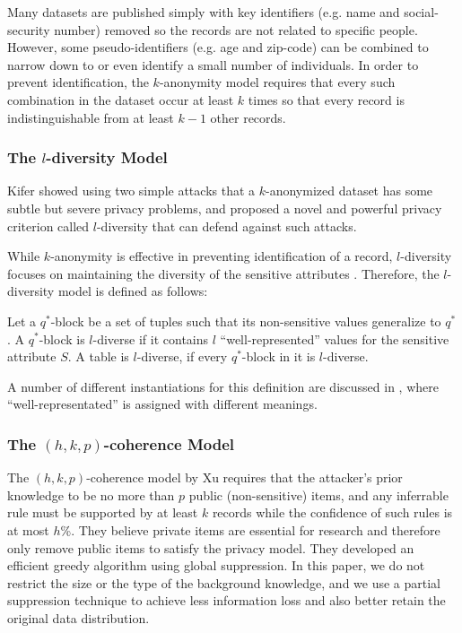 Many datasets are published simply with key identifiers (e.g. name and
social-security number) removed so the records are not related to specific
people.  However, some pseudo-identifiers (e.g. age and zip-code) can be
combined to narrow down to or even identify a small number of individuals.
In order to prevent identification, the $k$-anonymity model requires that
every such combination in the dataset occur at least $k$ times so that
every record is indistinguishable from at least $k-1$ other records.

\subsubsection{The $l$-diversity Model}

Kifer \etal \cite{Kifer:l-diversity} showed using two simple attacks that a
$k$-anonymized dataset has some subtle but severe privacy problems, and
proposed a novel and powerful privacy criterion called $l$-diversity that
can defend against such attacks.

While $k$-anonymity is effective in preventing identification of a record,
$l$-diversity focuses on maintaining the diversity of the sensitive attributes \cite{aggarwal2008general}.
Therefore, the $l$-diversity model is defined as follows:

\begin{definition}
  Let a $q^*$-block be a set of tuples such that its non-sensitive values
  generalize to $q^*$.  A $q^*$-block is $l$-diverse if it contains $l$
  ``well-represented'' values for the sensitive attribute $S$.  A table
  is $l$-diverse, if every $q^*$-block in it is $l$-diverse.
\end{definition}

A number of different instantiations for this definition are discussed
in \cite{Kifer:l-diversity}, where ``well-representated'' is assigned with
different meanings.

\subsubsection{The $(h,k,p)$-coherence Model}

The $(h,k,p)$-coherence model by Xu \etal \cite{Xu:2008:ATD}
requires that the attacker's prior knowledge to be no more than $p$ public
(non-sensitive) items, and any inferrable rule must be supported by at least
$k$ records while the confidence of such rules is at most $h$\%. They believe
private items are essential for research and therefore only remove public
items to satisfy the privacy model. They developed an efficient greedy
algorithm using global suppression. In this paper, we do not restrict the
size or the type of the background knowledge, and we use a partial
suppression technique to achieve less information loss and also better retain
the original data distribution.

